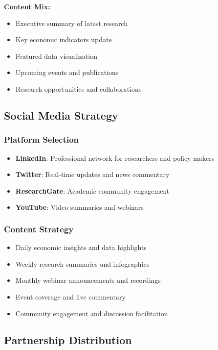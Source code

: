 \documentclass[11pt,a4paper]{article}
\begin{document}
\textbf{Content Mix:}
\begin{itemize}
    \item Executive summary of latest research
    \item Key economic indicators update
    \item Featured data visualization
    \item Upcoming events and publications
    \item Research opportunities and collaborations
\end{itemize}

\subsection{Social Media Strategy}

\subsubsection{Platform Selection}
\begin{itemize}
    \item \textbf{LinkedIn}: Professional network for researchers and policy makers
    \item \textbf{Twitter}: Real-time updates and news commentary
    \item \textbf{ResearchGate}: Academic community engagement
    \item \textbf{YouTube}: Video summaries and webinars
\end{itemize}

\subsubsection{Content Strategy}
\begin{itemize}
    \item Daily economic insights and data highlights
    \item Weekly research summaries and infographics
    \item Monthly webinar announcements and recordings
    \item Event coverage and live commentary
    \item Community engagement and discussion facilitation
\end{itemize}

\subsection{Partnership Distribution}
\end{document}
